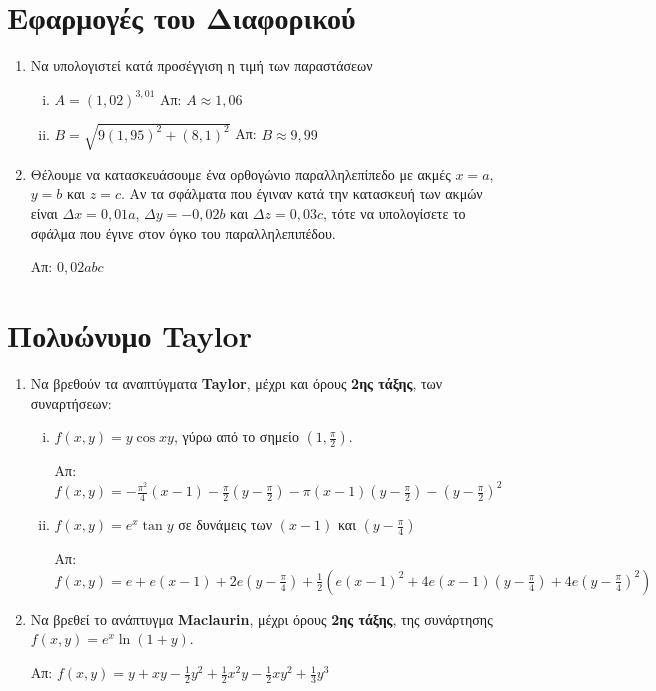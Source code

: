 \section*{Εφαρμογές του Διαφορικού}

\begin{enumerate}
  \item Να υπολογιστεί κατά προσέγγιση η τιμή των παραστάσεων
    \begin{enumerate}[i)]
      \item $A = (1,02)^{3,01} $ \hfill Απ: $ A \approx 1,06 $ 
      \item $B =  \sqrt{ 9(1,95)^{2} + (8,1)^{2} } $ 
        \hfill Απ: $ B \approx 9,99 $ 
    \end{enumerate}

  \item Θέλουμε να κατασκευάσουμε ένα ορθογώνιο παραλληλεπίπεδο με ακμές $ x = a $, 
    $ y=b $ και $ z=c $. Αν τα σφάλματα που έγιναν κατά την κατασκευή των ακμών 
    είναι $ \Delta x = 0,01a $, $ \Delta y = -0,02b $ και $ \Delta z = 0,03c $, 
    τότε να υπολογίσετε το σφάλμα που έγινε στον όγκο του παραλληλεπιπέδου.

    \hfill Απ: $ 0,02abc $ 
\end{enumerate}


\section*{Πολυώνυμο Taylor}

\begin{enumerate}
  \item Να βρεθούν τα αναπτύγματα \textbf{Taylor}, μέχρι και όρους 
    \textbf{2ης τάξης}, των συναρτήσεων:

    \begin{enumerate}[i)]
      \item  $f(x,y)=y\cos{xy} $, γύρω από το σημείο 
        $ \left(1, \frac{ \pi }{ 2 }\right) $.

        \hfill Απ: $f(x,y)=-\frac{\pi^{2}}{4}(x-1) - \frac{ \pi }{ 2 } 
        \left(y - \frac{ \pi }{2 }\right) - \pi(x-1)
        \left(y-\frac{\pi}{2}\right)- \left(y- \frac{ \pi }{ 2} \right)^{2} $

      \item $ f(x,y)=e^{x}\tan{y} $ σε δυνάμεις των $ (x-1) $ και 
        $ \left(y - \frac{ \pi }{ 4 }\right) $

        \hfill Απ: $ f(x,y) = e + e(x-1) + 2e\left(y- \frac{ \pi }{ 4 }\right)
        + \frac{1}{ 2 } \left(e(x-1)^{2}+4e(x-1)\left(y- \frac{ \pi }{ 4 }
        \right) + 4e\left(y- \frac{ \pi }{ 4 } \right)^{2}\right) $
    \end{enumerate}

  \item Να βρεθεί το ανάπτυγμα \textbf{Maclaurin}, μέχρι όρους \textbf{2ης
    τάξης}, της συνάρτησης $ f(x,y) = e^{x}\ln(1+y)$.

    \hfill Απ: $ f(x,y)=y + xy - \frac{1}{ 2 } y^{2} + \frac{1}{ 2 } x^{2}y - 
    \frac{1}{ 2 } xy^{2} + \frac{1}{ 3 } y^{3} $
\end{enumerate}





